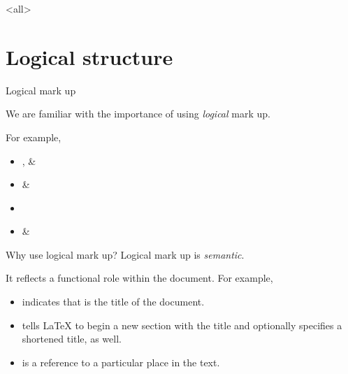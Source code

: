 \mode<all>
\overleaf
\mode*

\section{Logical structure}

\begin{frame}[fragile]{Logical mark up}

  We are familiar with the importance of using \emph{logical} mark up.

  For example,
  \begin{itemize}
	\item {},  \& 
	\item {} \& 
	\item {}
	\item {} \& 
  \end{itemize}

\end{frame}

\begin{frame}[fragile]{Why use logical mark up?}
  Logical mark up is \emph{semantic}.

  It reflects a functional role within the document.
  For example,
  \begin{itemize}
	\item {} indicates that  is the title of the document.
	\item {} tells \LaTeX{} to begin a new section with the title  and optionally specifies a shortened title,  as well.
	\item {} is a reference to a particular place in the text.
  \end{itemize}

\end{frame}

